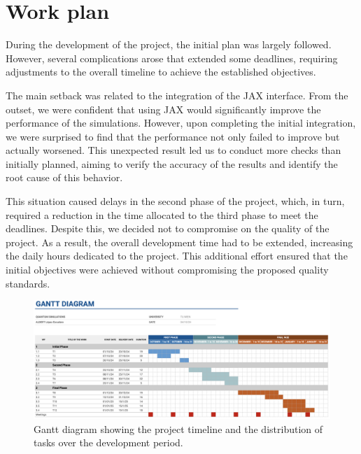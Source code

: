 \section{Work plan}

During the development of the project, the initial plan was largely followed. However, several complications arose that extended some deadlines, requiring adjustments to the overall timeline to achieve the established objectives.

The main setback was related to the integration of the JAX interface. From the outset, we were confident that using JAX would significantly improve the performance of the simulations. However, upon completing the initial integration, we were surprised to find that the performance not only failed to improve but actually worsened. This unexpected result led us to conduct more checks than initially planned, aiming to verify the accuracy of the results and identify the root cause of this behavior.

This situation caused delays in the second phase of the project, which, in turn, required a reduction in the time allocated to the third phase to meet the deadlines. Despite this, we decided not to compromise on the quality of the project. As a result, the overall development time had to be extended, increasing the daily hours dedicated to the project. This additional effort ensured that the initial objectives were achieved without compromising the proposed quality standards.

\begin{figure}[H]
  \centering
  \includegraphics[width=1\textwidth]{img/Gantt_diagram.png}
  \caption{Gantt diagram showing the project timeline and the distribution of tasks over the development period.}
  \label{fig:gantt_diagram}
\end{figure}